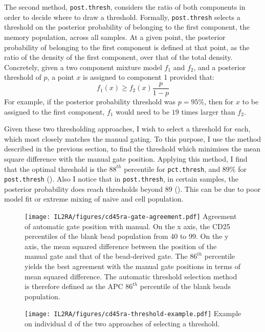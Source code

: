 The second method, \texttt{post.thresh}, considers the ratio of both components in order to decide where to draw a threshold.
Formally, \texttt{post.thresh} selects a threshold on the posterior probability of belonging to the first component, the memory population, across all samples.
At a given point, the posterior probability of belonging to the first component is defined at that point, as the ratio of the density of the first component,
over that of the total density.
Concretely, given a two component mixture model $f_1$ and $f_2$, and a posterior threshold of $p$, a point $x$ is assigned
to component 1 provided that:
\[
  f_1(x) \geq f_2(x) \dfrac{p}{1-p}
\]
For example, if the posterior probability threshold was $p=95\%$, then for $x$ to be assigned to the first component, $f_1$ would need to be $19$ times larger than $f_2$.

Given these two thresholding approaches, I wish to select a threshold for each, which most closely matches the manual gating.
To this purpose, I use the method described in the previous section, to find the threshold which minimises the mean square difference with the manual gate position.
Applying this method, I find that the optimal threshold is the $88^{th}$ percentile for \texttt{pct.thresh},
and $89\%$ for \texttt{post.thresh} ().
Also I notice that in \texttt{post.thresh}, in certain samples,  the posterior probability does reach thresholds beyond $89$ ().
This can be due to poor model fit or extreme mixing of naive and cell population.


\begin{figure}[h]
\centering
  \texttt{[image: IL2RA/figures/cd45ra-gate-agreement.pdf]}
{ Agreement of automatic gate position with manual. }
{
On the x axis, the CD25 percentiles of the blank bead population from 40 to 99.
On the y axis, the mean squared difference between the position of the manual gate and that of the bead-derived gate.
The $86^{th}$ percentile yields the best agreement with the manual gate positions in terms of mean squared difference.
The automatic threshold selection method  is therefore defined as the APC $86^{th}$ percentile of the blank beads population.
}
\end{figure}

\begin{figure}[h]
\centering
  \texttt{[image: IL2RA/figures/cd45ra-threshold-example.pdf]}
{ Example on individual d of the two approaches of selecting a threshold. }
{
}
\end{figure}

